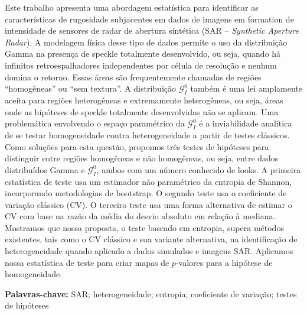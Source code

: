 Este trabalho apresenta uma abordagem estatística para identificar as características de rugosidade subjacentes em dados de imagens em formation de intensidade de sensores de radar de abertura sintética (SAR -- \textit{Synthetic Aperture Radar}). 
A modelagem física desse tipo de dados permite o uso da distribuição Gamma na presença de speckle totalmente desenvolvido, ou seja, quando há infinitos retroespalhadores independentes por célula de resolução e nenhum domina o retorno.
Essas áreas são frequentemente chamadas de regiões ``homogêneas'' ou ``sem textura''. 
A distribuição $\mathcal{G}_I^0$ também é uma lei amplamente aceita para regiões heterogêneas e extremamente heterogêneas, ou seja, áreas onde as hipóteses de speckle totalmente desenvolvidas não se aplicam.
Uma problemática envolvendo o espaço paramétrico da $\mathcal{G}_I^0$ é a inviabilidade analítica de se testar homogeneidade contra heterogeneidade a partir de testes clássicos. 
Como soluções para esta questão, propomos três testes de hipóteses  para distinguir entre regiões homogêneas e não homogêneas, ou seja, entre dados distribuídos Gamma e $\mathcal{G}_I^0$, ambos com um número conhecido de looks.
A primeira estatística de teste usa um estimador não paramétrico da entropia de Shannon, incorporando metodologias de bootstrap.
O segundo teste usa o coeficiente de variação clássico (CV). 
O terceiro teste usa uma forma alternativa de estimar o CV com base na razão da média do desvio absoluto em relação à mediana.
Mostramos que nossa proposta, o teste baseado em entropia, supera métodos existentes, tais como o CV clássico e sua variante alternativa, na identificação de heterogeneidade quando aplicado a dados simulados e imagens SAR.
Aplicamos nossa estatística de teste para criar mapas de $p$-valores para a hipótese de homogeneidade. 



\par
\noindent \textbf{Palavras-chave:} SAR; heterogeneidade; entropia; coeficiente de variação; testes de hipóteses

